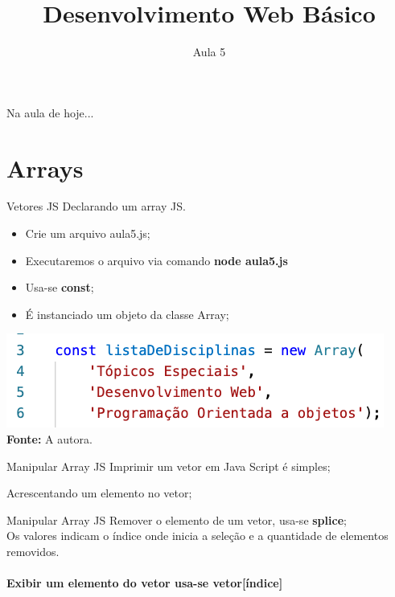 \documentclass{beamer}
\title{Desenvolvimento Web Básico}
\subtitle{Aula 5}
\begin{document}
\frame{
 \titlepage
}

\begin{frame}{Na aula de hoje...} 
\tableofcontents 
\end{frame}
\section{Arrays}
\begin{frame}{Vetores JS}
Declarando um array JS.
\begin{itemize}
    \item Crie um arquivo aula5.js;
    \item Executaremos o arquivo via comando \textbf{node aula5.js}
    \item Usa-se \textbf{const};
    \item É instanciado um objeto da classe Array;
\end{itemize}
  \begin{center}
       \includegraphics[height=0.2\paperheight]{fig/aula5/aula_js_5_1.png} \\
       \tiny{\textbf{Fonte: } A autora.}
      \end{center}
\end{frame}
\begin{frame}{Manipular Array JS}
Imprimir um vetor em Java Script é simples;

Acrescentando um elemento no vetor; 

\end{frame}
\begin{frame}{Manipular Array JS}
Remover o elemento de um vetor, usa-se \textbf{splice};
\\
Os valores indicam o índice onde inicia a seleção e a quantidade de elementos removidos.\\
\paragraph{Exibir um elemento do vetor usa-se vetor[índice]}

\cite{wschool2018js}
\end{frame}
\end{document}

